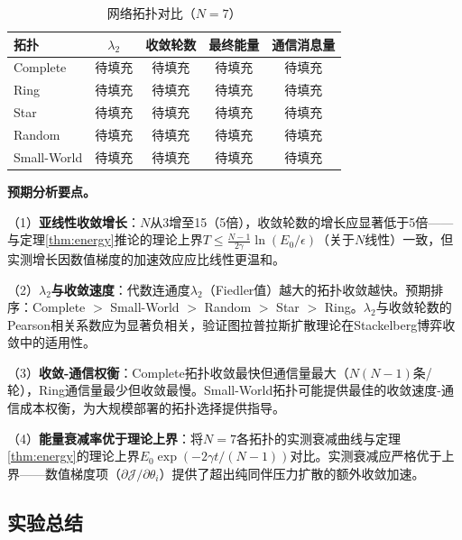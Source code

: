\documentclass[12pt,a4paper,UTF8,fontset=fandol]{ctexart}
\begin{document}
\begin{table}[H]
\centering
\caption{网络拓扑对比（$N=7$）}\label{tab:exp6_topo}
\begin{tabular}{lcccc}
\toprule
拓扑 & $\lambda_2$ & 收敛轮数 & 最终能量 & 通信消息量 \\
\midrule
Complete & 待填充 & 待填充 & 待填充 & 待填充 \\
Ring & 待填充 & 待填充 & 待填充 & 待填充 \\
Star & 待填充 & 待填充 & 待填充 & 待填充 \\
Random & 待填充 & 待填充 & 待填充 & 待填充 \\
Small-World & 待填充 & 待填充 & 待填充 & 待填充 \\
\bottomrule
\end{tabular}
\end{table}


\textbf{预期分析要点。}

（1）\textbf{亚线性收敛增长}：$N$从3增至15（5倍），收敛轮数的增长应显著低于5倍——与定理\ref{thm:energy}推论的理论上界$T \leq \frac{N-1}{2\gamma} \ln(E_0/\epsilon)$（关于$N$线性）一致，但实测增长因数值梯度的加速效应应比线性更温和。

（2）\textbf{$\lambda_2$与收敛速度}：代数连通度$\lambda_2$（Fiedler值）越大的拓扑收敛越快。预期排序：Complete $>$ Small-World $>$ Random $>$ Star $>$ Ring。$\lambda_2$与收敛轮数的Pearson相关系数应为显著负相关，验证图拉普拉斯扩散理论在Stackelberg博弈收敛中的适用性。

（3）\textbf{收敛-通信权衡}：Complete拓扑收敛最快但通信量最大（$N(N-1)$条/轮），Ring通信量最少但收敛最慢。Small-World拓扑可能提供最佳的收敛速度-通信成本权衡，为大规模部署的拓扑选择提供指导。

（4）\textbf{能量衰减率优于理论上界}：将$N=7$各拓扑的实测衰减曲线与定理\ref{thm:energy}的理论上界$E_0 \exp(-2\gamma t/(N-1))$对比。实测衰减应严格优于上界——数值梯度项（$\partial \mathcal{J}/\partial \theta_i$）提供了超出纯同伴压力扩散的额外收敛加速。

\subsection{实验总结}
\end{document}
